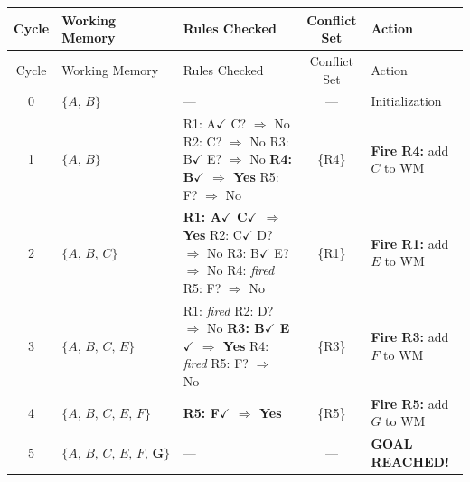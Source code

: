 \documentclass[12pt,a4paper]{article}
\begin{document}
\begin{center}
\renewcommand{\arraystretch}{1.55}
\begin{longtable}{c p{3.6cm} p{3.8cm} c p{3.5cm}}
\toprule
\textbf{Cycle} & \textbf{Working Memory} & \textbf{Rules Checked} &
\textbf{Conflict Set} & \textbf{Action} \\
\midrule
\endfirsthead
\toprule
Cycle & Working Memory & Rules Checked & Conflict Set & Action \\
\midrule
\endhead
0 & $\{A,\,B\}$ & --- & --- & Initialization \\
\midrule
1 & $\{A,\,B\}$ &
  R1: A$\checkmark$ C?\texttimes{} $\Rightarrow$ No\newline
  R2: C?\texttimes{} $\Rightarrow$ No\newline
  R3: B$\checkmark$ E?\texttimes{} $\Rightarrow$ No\newline
  \textbf{R4: B$\checkmark$ $\Rightarrow$ Yes}\newline
  R5: F?\texttimes{} $\Rightarrow$ No
  & \{R4\} & \textbf{Fire R4:} add $C$ to WM \\
\midrule
2 & $\{A,\,B,\,C\}$ &
  \textbf{R1: A$\checkmark$ C$\checkmark$ $\Rightarrow$ Yes}\newline
  R2: C$\checkmark$ D?\texttimes{} $\Rightarrow$ No\newline
  R3: B$\checkmark$ E?\texttimes{} $\Rightarrow$ No\newline
  R4: \textit{fired}\newline
  R5: F?\texttimes{} $\Rightarrow$ No
  & \{R1\} & \textbf{Fire R1:} add $E$ to WM \\
\midrule
3 & $\{A,\,B,\,C,\,E\}$ &
  R1: \textit{fired}\newline
  R2: D?\texttimes{} $\Rightarrow$ No\newline
  \textbf{R3: B$\checkmark$ E$\checkmark$ $\Rightarrow$ Yes}\newline
  R4: \textit{fired}\newline
  R5: F?\texttimes{} $\Rightarrow$ No
  & \{R3\} & \textbf{Fire R3:} add $F$ to WM \\
\midrule
4 & $\{A,\,B,\,C,\,E,\,F\}$ &
  \textbf{R5: F$\checkmark$ $\Rightarrow$ Yes}
  & \{R5\} & \textbf{Fire R5:} add $G$ to WM \\
\midrule
5 & $\{A,\,B,\,C,\,E,\,F,\,\mathbf{G}\}$ & --- & --- & \textbf{GOAL REACHED!} \\
\bottomrule
\end{longtable}
\end{center}
\end{document}
